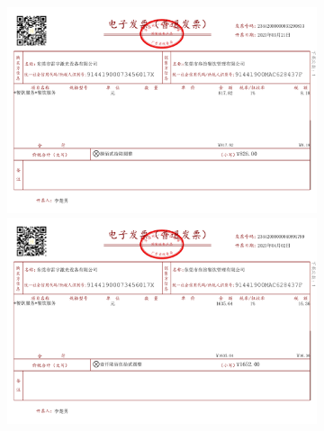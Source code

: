 \documentclass[a4paper]{article}
\begin{document}
	
	\begin{figure}
		\centering %
		\begin{subfigure}{0.95\linewidth}
			\includegraphics[width=\linewidth]{software/3}
			\includegraphics[width=\linewidth]{software/4}
		\end{subfigure}
	\end{figure} 
	
\end{document}
